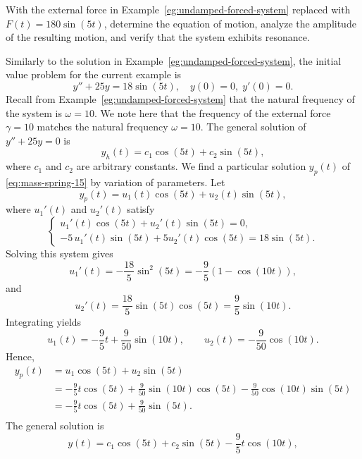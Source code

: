  
\begin{example}[Resonance: $b=0, F(t)= F_0 \sin(\omega t)$]\label{eg:resonance-mass-spring-1}
With the external force in Example~\ref{eg:undamped-forced-system} replaced with  \( F(t) = 180\sin(5t)\),  determine the equation of motion, analyze the amplitude of the resulting motion, and verify that the system exhibits resonance.
\end{example}
\begin{solution} Similarly to the solution in Example~\ref{eg:undamped-forced-system}, the initial value problem for the current example is
	\begin{equation} \label{eq:mass-spring-15}
		y'' + 25y = 18\sin(5t), \quad y(0) =0,\; y'(0) = 0.
	\end{equation}
	Recall from Example~\ref{eg:undamped-forced-system} that the natural  frequency of the system is
	\(
	\omega  = 10.
	\)
	We note here that the frequency of the external force $\gamma =10$ matches the natural frequency $\omega = 10.$
	The general solution of \( y'' + 25y = 0 \) is
	\[
	y_h(t) = c_1\cos(5t) + c_2\sin(5t),
	\]
	where $c_1$ and $c_2$ are arbitrary constants.
	We find a particular solution $y_p(t)$ of \eqref{eq:mass-spring-15} by variation of parameters.
	Let
	\[
	y_p(t) = u_1(t)\cos(5t) + u_2(t)\sin(5t),
	\]
	where \( u_1'(t) \) and \( u_2'(t) \) satisfy
	\[
	\begin{cases}
		u_1'(t)\cos(5t) + u_2'(t)\sin(5t) = 0, \\[4pt]
		-5\,u_1'(t)\sin(5t) + 5u_2'(t)\cos(5t) = 18\sin(5t).
	\end{cases}
	\]
	Solving this system gives
	\[
	u_1'(t) = -\frac{18}{5}\sin^2(5t) =-\frac{9}{5}(1-\cos(10t)),\] and  
	\[u_2'(t) = \frac{18}{5}\sin(5t)\cos(5t) =\frac{9}{5}\sin(10t).
	\]
	Integrating yields
	\[
	u_1(t) = -\frac{9}{5}t + \frac{9}{50} \sin(10t), \qquad 
	u_2(t) = -\frac{9}{50} \cos(10t).
	\]
	Hence,
	\[
	\begin{aligned}
		y_p(t) &= u_1\cos(5t) + u_2\sin(5t) \\[2pt]
		&= -\frac{9}{5}t \cos(5t)  + \frac{9}{50}\sin(10t) \cos(5t) 
		-\frac{9}{50}\cos(10t)\sin(5t)\\[2pt]
		&=-\frac{9}{5}t \cos(5t)  + \frac{9}{50}\sin(5t). \\[2pt]
	\end{aligned}
	\]
%	
The general solution  is 
	\[
	y(t) = c_1\cos(5t) + c_2\sin(5t) - \frac{9}{5}t\cos(10t),
\]
\end{solution}
